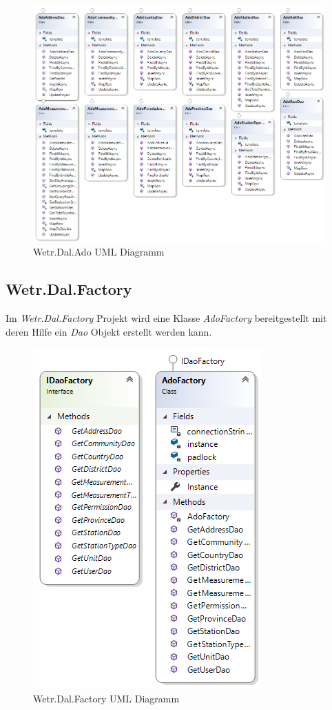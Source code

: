 \begin{figure}[H]
\centering
\includegraphics[width=\textwidth]{pictures/Wetr_Dal_Ado.png}
\caption{Wetr.Dal.Ado UML Diagramm}
\label{fig:Wetr.Dal.Ado}
\end{figure}
\raggedright

\newpage
\subsection{Wetr.Dal.Factory}
Im \textit{Wetr.Dal.Factory} Projekt wird eine Klasse \textit{AdoFactory} bereitgestellt mit deren Hilfe ein \textit{Dao} Objekt erstellt werden kann.

\begin{figure}[H]
\centering
\includegraphics[width=.6\textwidth]{pictures/Wetr_Dal_Factory.png}
\caption{Wetr.Dal.Factory UML Diagramm}
\label{fig:Wetr.Dal.Factory}
\end{figure}
\raggedright

